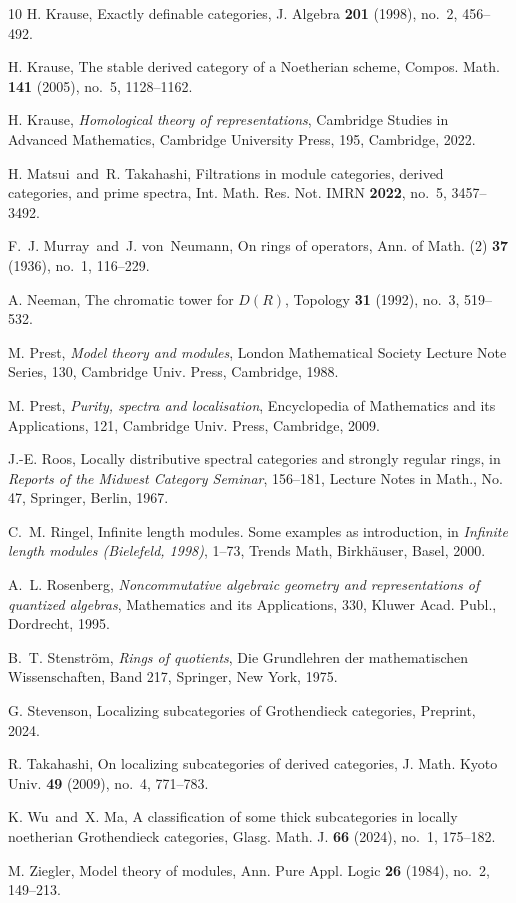 \documentclass[a4paper]{amsart}
\theoremstyle{plain}
\theoremstyle{definition}
\theoremstyle{remark}
\numberwithin{equation}{section}
\begin{document}
\begin{thebibliography}{10}
 H. Krause, Exactly definable categories, J. Algebra
  {\bf 201} (1998), no.~2, 456--492.

 H. Krause, The stable derived category of a
  Noetherian scheme, Compos. Math. {\bf 141} (2005), no.~5,
  1128--1162.  

 H. Krause, {\it Homological theory of representations}, 
 Cambridge Studies in Advanced Mathematics, Cambridge University
 Press,  195, Cambridge, 2022.

 H. Matsui\ and\ R. Takahashi, Filtrations in module
  categories, derived categories, and prime spectra,
  Int. Math. Res. Not. IMRN {\bf 2022}, no.~5, 3457--3492.

 F.~J. Murray\ and\ J. von~Neumann, On rings of
  operators, Ann. of Math. (2) {\bf 37} (1936), no.~1, 116--229.

 A. Neeman, The chromatic tower for $D(R)$, Topology {\bf
  31} (1992), no.~3, 519--532.

 M. Prest, {\it Model theory and modules}, London
  Mathematical Society Lecture Note Series, 130, Cambridge
  Univ. Press, Cambridge, 1988.

 M. Prest, {\it Purity, spectra and localisation},
  Encyclopedia of Mathematics and its Applications, 121, Cambridge
  Univ. Press, Cambridge, 2009.

 J.-E. Roos, Locally distributive spectral categories
  and strongly regular rings, in {\it Reports of the Midwest Category
    Seminar}, 156--181, Lecture Notes in Math., No. 47, Springer,
  Berlin, 1967.

 C.~M. Ringel, Infinite length modules. Some examples
  as introduction, in {\it Infinite length modules (Bielefeld, 1998)},
  1--73, Trends Math, Birkh\"{a}user, Basel, 2000.
  
 A.~L. Rosenberg, {\it Noncommutative algebraic
    geometry and representations of quantized algebras}, Mathematics
  and its Applications, 330, Kluwer Acad. Publ., Dordrecht, 1995.

 B.~T. Stenstr\"{o}m, {\it Rings of quotients}, Die
  Grundlehren der mathematischen Wissenschaften, Band 217, Springer,
  New York, 1975.

 G. Stevenson, Localizing subcategories of
  Grothendieck categories, Preprint, 2024.

 R. Takahashi, On localizing subcategories of derived
  categories, J. Math. Kyoto Univ. {\bf 49} (2009), no.~4, 771--783.
  
 K. Wu\ and\ X. Ma, A classification of some thick
  subcategories in locally noetherian Grothendieck categories,
  Glasg. Math. J. {\bf 66} (2024), no.~1, 175--182.

 M. Ziegler, Model theory of modules, Ann. Pure
  Appl. Logic {\bf 26} (1984), no.~2, 149--213.

\end{thebibliography}
\end{document}
